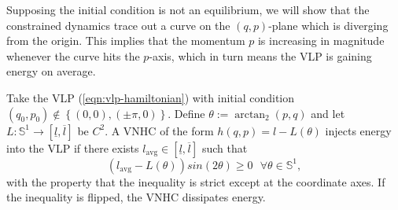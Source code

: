 Supposing the initial condition is not an equilibrium, we will show that the
constrained dynamics trace out a curve on the \((q,p)\)-plane which is diverging
from the origin.  
This implies that the momentum \(p\) is increasing in magnitude whenever the
curve hits the \(p\)-axis, which in turn means the VLP is gaining energy on
average.

\begin{thm}\label{thm:vlp-energy-stabilization}
   Take the VLP (\ref{eqn:vlp-hamiltonian}) with initial condition 
   \((q_0,p_0) \not \in \left\{(0,0),(\pm\pi,0)\right\}\).
   Define \(\theta := \arctan_2(p,q)\) and let 
   \(L : \mathbb{S}^1 \rightarrow [\underline{l},\overline{l}]\) be \(C^2\).
   A VNHC of the form \(h(q,p) = l - L(\theta)\) injects energy into the VLP
   if there exists 
   \(l_\text{avg} \in [\underline{l},\overline{l}]\) such that 
   \begin{equation}\label{eqn:vlp-energy-gain-condition}
      \left(l_\text{avg} - L(\theta)\right)sin(2\theta) \geq 0 \text{ }\forall \theta \in \mathbb{S}^1
      ,
   \end{equation}
   with the property that the inequality is strict except at the
   coordinate axes.
   If the inequality is flipped, the VNHC dissipates energy. 
\end{thm}
